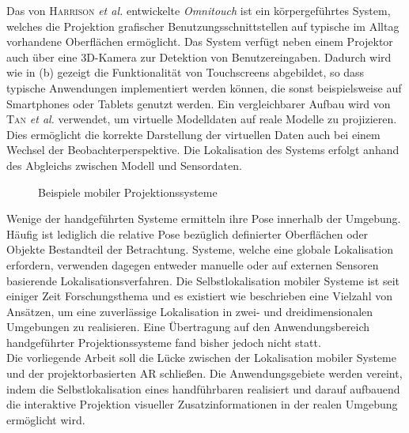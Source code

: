 Das von \textsc{Harrison} \textit{et al.} \cite{Harrison2011} entwickelte \textit{Omnitouch} ist ein körpergeführtes System, welches die Projektion grafischer Benutzungsschnittstellen auf typische im Alltag vorhandene Oberflächen ermöglicht. Das System verfügt neben einem Projektor auch über eine 3D-Kamera zur Detektion von Benutzereingaben. Dadurch wird wie in  (b) gezeigt die Funktionalität von Touchscreens abgebildet, so dass typische Anwendungen implementiert werden können, die sonst beispielsweise auf Smartphones oder Tablets genutzt werden. Ein vergleichbarer Aufbau wird von \textsc{Tan} \textit{et al.} \cite{Tan2013} verwendet, um virtuelle Modelldaten auf reale Modelle zu projizieren. Dies ermöglicht die korrekte Darstellung der virtuellen Daten auch bei einem Wechsel der Beobachterperspektive. Die Lokalisation des Systems erfolgt anhand des Abgleichs zwischen Modell und Sensordaten.

\begin{figure}[!ht]
	\begin{center}
	\caption{Beispiele mobiler Projektionssysteme}
	\label{fig.projsystems}
	\end{center}
\end{figure}

\prever{
}

Wenige der handgeführten Systeme ermitteln ihre Pose innerhalb der Umgebung. Häufig ist lediglich die relative Pose bezüglich definierter Oberflächen oder Objekte Bestandteil der Betrachtung. Systeme, welche eine globale Lokalisation erfordern, verwenden dagegen entweder manuelle oder auf externen Sensoren basierende Lokalisationsverfahren. Die Selbstlokalisation mobiler Systeme ist seit einiger Zeit Forschungsthema und es existiert wie beschrieben eine Vielzahl von Ansätzen, um eine zuverlässige Lokalisation in zwei- und dreidimensionalen Umgebungen zu realisieren. Eine Übertragung auf den Anwendungsbereich handgeführter Projektionssysteme fand bisher jedoch nicht statt.\\

Die vorliegende Arbeit soll die Lücke zwischen der Lokalisation mobiler Systeme und der projektorbasierten AR schließen. Die Anwendungsgebiete werden vereint, indem die Selbstlokalisation eines handführbaren  realisiert und darauf aufbauend die interaktive Projektion visueller Zusatzinformationen in der realen Umgebung ermöglicht wird.\\


